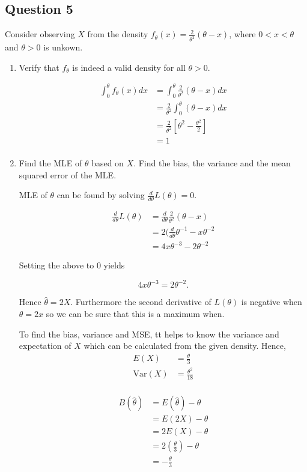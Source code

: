 \documentclass{tufte-book}
\newcommand{\Var}{\mathrm{Var}}
\theoremstyle{mytheoremstyle}
\theoremstyle{mylemstyle}
\theoremstyle{mydefstyle}
\begin{document}
\subsection{Question 5}
Consider observing $X$ from the density $f_\theta(x)=\frac{2}{\theta^2}(\theta-x)$, where $0<x<\theta$ and $\theta>0$ is unkown.

\begin{enumerate}
\item Verify that $f_\theta$ is indeed a valid density for all $\theta > 0$.

\begin{align*}
\int_0^\theta f_\theta(x)dx &= \int_0^\theta \frac{2}{\theta^2}(\theta-x)dx\\
&= \frac{2}{\theta^2}\int_0^\theta (\theta-x)dx\\
&= \frac{2}{\theta^2}[\theta^2 -  \frac{\theta^2}{2}]\\
&= 1\\
\end{align*}

\item Find the MLE of $\theta$ based on $X$.  Find the bias, the variance and the mean squared error of the MLE.

 MLE of $\theta$ can be found by solving $\frac{d}{d\theta}L(\theta) = 0$.

\begin{align*}
\frac{d}{d\theta}L(\theta) &= \frac{d}{d\theta}\frac{2}{\theta^2}(\theta-x)\\
&= 2 (\frac{d}{d\theta}\theta^{-1} - x\theta^{-2}\\
&= 4x\theta^{-3} - 2\theta^{-2}
\end{align*}

Setting the above to $0$ yields

\[
4x\theta^{-3} = 2\theta^{-2}.
\]

Hence $\hat{\theta} = 2X$.  Furthermore the second derivative of $L(\theta)$ is negative when $\theta=2x$ so we can be sure that this is a maximum when.

To find the bias, variance and MSE, tt helps to know the variance and expectation of $X$ which can be calculated from the given density.  Hence,
\begin{align*}
E(X) &= \frac{\theta}{3}\\
\Var(X) &= \frac{\theta^2}{18}\\
\end{align*}

\begin{align*}
B(\hat{\theta}) &= E(\hat{\theta}) - \theta\\
&= E(2X) - \theta\\
&= 2E(X) - \theta\\
&= 2(\frac{\theta}{3}) - \theta\\
&= -\frac{\theta}{3}
\end{align*}


\end{enumerate}
\end{document}
